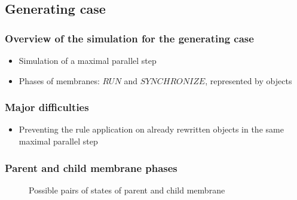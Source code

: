 
  \subsection{Generating case} %
  \label{sub:generating_case}

    \begin{frame}[t]\frametitle{Overview of the simulation for the generating case}
      \begin{itemize}
        \item Simulation of a maximal parallel step
        \item Phases of membranes: $RUN$ and $SYNCHRONIZE$, represented by objects
      \end{itemize}
    \end{frame}
    \note{}

    \begin{frame}[t]\frametitle{Major difficulties}
      \begin{itemize}
        \item Preventing the rule application on already rewritten objects in the same maximal parallel step
      \end{itemize}
    \end{frame}
    \note{}

    \providecommand{\narrow}[1]{\scalebox{.8}[1.0]{#1}}

    \begin{frame}[t]\frametitle{Parent and child membrane phases}
      \begin{figure}
        \def\svgwidth{\textwidth}
        
        \caption{Possible pairs of states of parent and child membrane}
        \label{fig:possible_pairs_of_states_of_parent_and_child_membrane}
      \end{figure}
    \end{frame}
    \note{}

